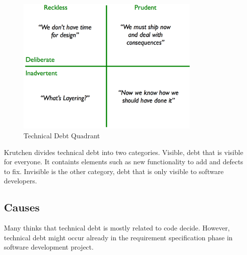 \begin{figure}
	\centering
	\includegraphics[width=0.8\textwidth]{images/techDebtQuadrant.png}
	\caption{Technical Debt Quadrant}
	\label{fig:techDebtQuad}
\end{figure}

Krutchen divides technical debt into two categories\cite{krutchen}. Visible, debt that is visible for everyone. It containts elements such as new functionality to add and defects to fix. Invisible is the other category, debt that is only visible to software developers.


\subsection{Causes}
Many thinks that technical debt is mostly related to code decide. However, technical debt might occur already in the requirement specification phase in software development project. 

